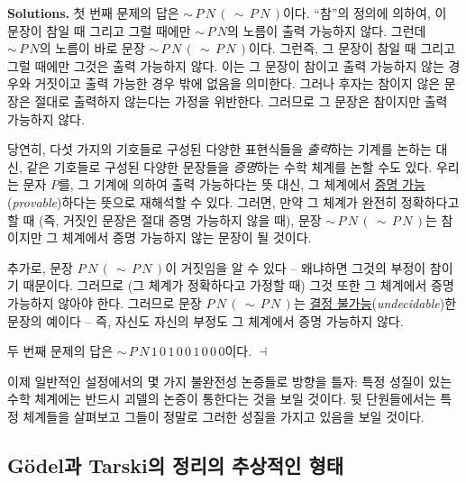 \documentclass[12pt]{paper}
\newenvironment{context}[1][]
{ \noindent \textbf{{#1}.} }
{ \hfill $ \dashv $ }
\begin{document}
\begin{context}[Solutions]
첫 번째 문제의 답은 $ \sim \, P \, N \, \left( \, \sim \, P \, N \, \right) $이다.
``참''의 정의에 의하여, 이 문장이 참일 때 그리고 그럴 때에만 $ \sim \, P \, N $의 노름이 출력 가능하지 않다.
그런데 $ \sim \, P \, N $의 노름이 바로 문장 $ \sim \, P \, N \, \left( \, \sim \, P \, N \, \right) $이다.
그런즉, 그 문장이 참일 때 그리고 그럴 때에만 그것은 출력 가능하지 않다.
이는 그 문장이 참이고 출력 가능하지 않는 경우와 거짓이고 출력 가능한 경우 밖에 없음을 의미한다.
그러나 후자는 참이지 않은 문장은 절대로 출력하지 않는다는 가정을 위반한다.
그러므로 그 문장은 참이지만 출력 가능하지 않다.

당연히, 다섯 가지의 기호들로 구성된 다양한 표현식들을 \textit{출력}하는 기계를 논하는 대신,
같은 기호들로 구성된 다양한 문장들을 \textit{증명}하는 수학 체계를 논할 수도 있다.
우리는 문자 $P$를, 그 기계에 의하여 출력 가능하다는 뜻 대신, 그 체계에서 \underline{증명 가능}(\textit{provable})하다는 뜻으로 재해석할 수 있다.
그러면, 만약 그 체계가 완전히 정확하다고 할 때 (즉, 거짓인 문장은 절대 증명 가능하지 않을 때),
문장 $ \sim \, P \, N \, \left( \, \sim \, P \, N \, \right) $는 참이지만 그 체계에서 증명 가능하지 않는 문장이 될 것이다.

추가로, 문장 $ P \, N \, \left( \, \sim \, P \, N \, \right) $이 거짓임을 알 수 있다 --
왜냐하면 그것의 부정이 참이기 때문이다.
그러므로 (그 체계가 정확하다고 가정할 때) 그것 또한 그 체계에서 증명 가능하지 않아야 한다.
그러므로 문장 $ P \, N \, \left( \, \sim \, P \, N \, \right) $는 \underline{결정 불가능}(\textit{undecidable})한 문장의 예이다 --
즉, 자신도 자신의 부정도 그 체계에서 증명 가능하지 않다.

두 번째 문제의 답은 $ \sim \, P \, N \, 1 \, 0 \, 1 \, 0 \, 0 \, 1 \, 0 \, 0 \, 0 $이다.
\end{context}

이제 일반적인 설정에서의 몇 가지 불완전성 논증들로 방향을 틀자:
특정 성질이 있는 수학 체계에는 반드시 괴델의 논증이 통한다는 것을 보일 것이다.
뒷 단원들에서는 특정 체계들을 살펴보고 그들이 정말로 그러한 성질을 가지고 있음을 보일 것이다.

\subsection{G\"odel과 Tarski의 정리의 추상적인 형태}
\hspace{12pt}
\end{document}
